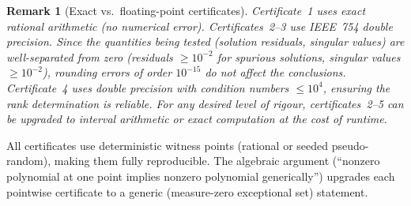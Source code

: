 \documentclass[11pt]{article}
\newtheorem{remark}[theorem]{Remark}
\begin{document}
\begin{remark}[Exact vs.\ floating-point certificates]
Certificate~1 uses exact rational arithmetic (no numerical error).
Certificates~2--3 use IEEE~754 double precision.
Since the quantities being tested (solution residuals, singular values)
are well-separated from zero (residuals $\ge 10^{-2}$ for spurious
solutions, singular values $\ge 10^{-2}$), rounding errors of order
$10^{-15}$ do not affect the conclusions.
Certificate~4 uses double precision with condition numbers $\le 10^4$,
ensuring the rank determination is reliable.
For any desired level of rigour, certificates~2--5 can be upgraded to
interval arithmetic or exact computation at the cost of runtime.
\end{remark}

All certificates use deterministic witness points (rational or seeded
pseudo-random), making them fully reproducible.
The algebraic argument (``nonzero polynomial at one point implies nonzero
polynomial generically'') upgrades each pointwise certificate to a
generic (measure-zero exceptional set) statement.
\end{document}
